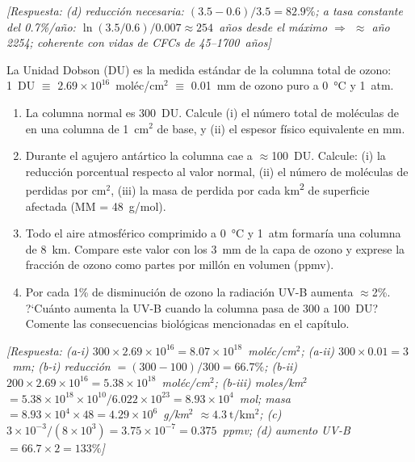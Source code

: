 \begin{bloque_ejercicios}
\begin{ejercicios}
\textit{[Respuesta:
(d) reducci\'on necesaria: $(3.5-0.6)/3.5 = 82.9\%$;
    a tasa constante del 0.7\%/a\~no:
    $\ln(3.5/0.6)/0.007 \approx 254$~a\~nos desde el
    m\'aximo $\Rightarrow$ $\approx$ a\~no 2254;
    coherente con vidas de CFCs de 45--1700~a\~nos]}

\item La Unidad Dobson (DU) es la medida est\'andar
de la columna total de ozono:
1~DU $\equiv$ $2.69\times10^{16}$~mol\'ec/cm$^2$
$\equiv$ 0.01~mm de ozono puro a \SI{0}{\celsius}
y 1~atm.

\begin{enumerate}[label=\alph*)]
    \item La columna normal es 300~DU.
          Calcule (i) el n\'umero total de mol\'eculas de
           en una columna de 1~cm$^2$ de base,
          y (ii) el espesor f\'isico equivalente en mm.

    \item Durante el agujero ant\'artico la columna cae
          a $\approx$100~DU. Calcule:
          (i) la reducci\'on porcentual respecto al valor
          normal,
          (ii) el n\'umero de mol\'eculas de 
          perdidas por cm$^2$,
          (iii) la masa de  perdida por cada
          \si{\kilo\metre\squared} de superficie afectada
          (MM  = 48~g/mol).

    \item Todo el aire atmosf\'erico comprimido a
          \SI{0}{\celsius} y 1~atm formar\'ia una columna
          de \SI{8}{\kilo\metre}. Compare este valor con
          los 3~mm de la capa de ozono y exprese la
          fracci\'on de ozono como partes por mill\'on
          en volumen (ppmv).

    \item Por cada 1\% de disminuci\'on de ozono
          la radiaci\'on UV-B aumenta $\approx$2\%.
          ?`Cu\'anto aumenta la UV-B cuando la columna
          pasa de 300 a 100~DU? Comente las consecuencias
          biol\'ogicas mencionadas en el cap\'itulo.
\end{enumerate}

\textit{[Respuesta:
(a-i) $300\times2.69\times10^{16}
      = 8.07\times10^{18}$~mol\'ec/cm$^2$;
(a-ii) $300\times0.01 = 3$~mm;
(b-i) reducci\'on $= (300-100)/300 = 66.7\%$;
(b-ii) $200\times2.69\times10^{16}
       = 5.38\times10^{18}$~mol\'ec/cm$^2$;
(b-iii) moles/km$^2$ $= 5.38\times10^{18}
        \times10^{10}/6.022\times10^{23}
        = 8.93\times10^4$~mol;
    masa $= 8.93\times10^4\times48
        = 4.29\times10^6$~g/km$^2$
        $\approx\SI{4.3}{\tonne\per\kilo\metre\squared}$;
(c) $3\times10^{-3}/(8\times10^3) = 3.75\times10^{-7}
    = 0.375$~ppmv;
(d) aumento UV-B $= 66.7\times2 = 133\%$]}

\end{ejercicios}
\end{bloque_ejercicios}
